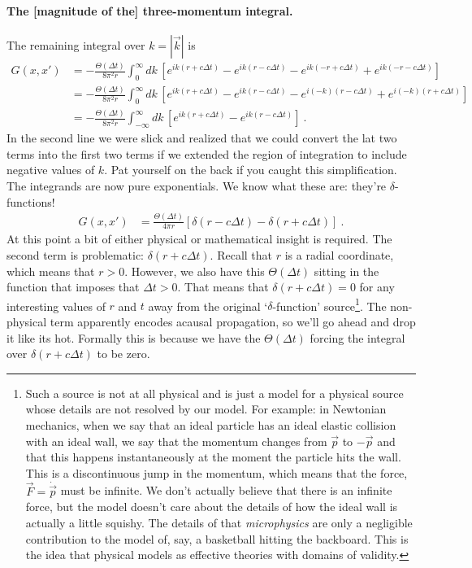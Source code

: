 \documentclass[
  11pt,
	colorful,
	raggedright,
]{tufte-style-thesis-flip}
\begin{document}
\paragraph{The [magnitude of the] three-momentum integral.} The remaining integral over $k=|\vec k|$ is
\begin{align}
  G(x,x')&= -
  \frac{\Theta(\Delta t)}{8\pi^2 r} 
  \int^\infty_0
  dk\, 
  \left[
    e^{ik(r+c\Delta t)}
    - e^{ik(r-c\Delta t)}
    - e^{ik(-r+c\Delta t)}
    + e^{ik(-r-c\Delta t)}
  \right] 
  \\
  &= -
  \frac{\Theta(\Delta t)}{8\pi^2 r} 
  \int^\infty_0
  dk\, 
  \left[
    e^{ik(r+c\Delta t)}
    - e^{ik(r-c\Delta t)}
    - e^{i(-k)(r-c\Delta t)}
    + e^{i(-k)(r+c\Delta t)}
  \right] 
  \\
  &= -
  \frac{\Theta(\Delta t)}{8\pi^2 r} 
  \int^\infty_{-\infty}
  dk\, 
  \left[
    e^{ik(r+c\Delta t)}
    - e^{ik(r-c\Delta t)}
  \right] 
  \ .
\end{align}
In the second line we were slick and realized that we could convert the lat two terms into the first two terms if we extended the region of integration to include negative values of $k$. Pat yourself on the back if you caught this simplification. The integrands are now pure exponentials. We know what these are: they're $\delta$-functions!
\begin{align}
  G(x,x')
  &=
  \frac{\Theta(\Delta t)}{4\pi r} 
  \left[ \delta(r-c\Delta t) - \delta(r+c\Delta t) \right]
  \ .
\end{align}
At this point a bit of either physical or mathematical insight is required. The second term is problematic: $\delta(r+c\Delta t)$. Recall that $r$ is a radial coordinate, which means that $r>0$. However, we also have this $\Theta(\Delta t)$ sitting in the function that imposes that $\Delta t > 0$. That means that $\delta(r+c\Delta t) = 0$ for any interesting values of $r$ and $t$ away from the original `$\delta$-function' source\footnote{Such a source is not at all physical and is just a model for a physical source whose details are not resolved by our model. For example: in Newtonian mechanics, when we say that an ideal particle has an ideal elastic collision with an ideal wall, we say that the momentum changes from $\vec{p}$ to $-\vec{p}$ and that this happens instantaneously at the moment the particle hits the wall. This is a discontinuous jump in the momentum, which means that the force, $\vec{F} = \dot{\vec{p}}$ must be infinite. We don't actually believe that there is an infinite force, but the model doesn't care about the details of how the ideal wall is actually a little squishy. The details of that \emph{microphysics} are only a negligible contribution to the model of, say, a basketball hitting the backboard. This is the idea that physical models as effective theories with domains of validity.}. The non-physical term apparently encodes acausal propagation, so we'll go ahead and drop it like its hot. Formally this is because we have the $\Theta(\Delta t)$ forcing the integral over $\delta(r+c\Delta t)$ to be zero.
\end{document}
